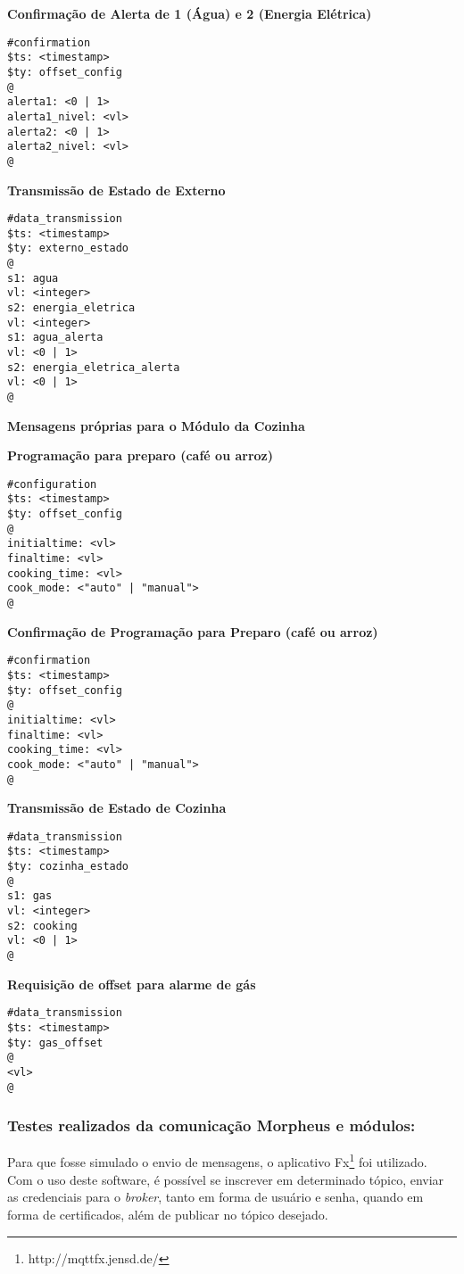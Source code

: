 \textbf{Confirmação de Alerta de 1 (Água) e 2 (Energia Elétrica)}
\begin{lstlisting}
#confirmation
$ts: <timestamp>
$ty: offset_config
@
alerta1: <0 | 1>
alerta1_nivel: <vl>
alerta2: <0 | 1>
alerta2_nivel: <vl>
@
\end{lstlisting}

\textbf{Transmissão de Estado de Externo}
\begin{lstlisting}
#data_transmission
$ts: <timestamp>
$ty: externo_estado
@
s1: agua
vl: <integer>
s2: energia_eletrica
vl: <integer>
s1: agua_alerta
vl: <0 | 1>
s2: energia_eletrica_alerta
vl: <0 | 1>
@
\end{lstlisting}

\textbf{Mensagens próprias para o Módulo da Cozinha}

\textbf{Programação para preparo (café ou arroz)}
\begin{lstlisting}
#configuration
$ts: <timestamp>
$ty: offset_config
@
initialtime: <vl>
finaltime: <vl>
cooking_time: <vl>
cook_mode: <"auto" | "manual">
@
\end{lstlisting}

\textbf{Confirmação de Programação para Preparo (café ou arroz)}
\begin{lstlisting}
#confirmation
$ts: <timestamp>
$ty: offset_config
@
initialtime: <vl>
finaltime: <vl>
cooking_time: <vl>
cook_mode: <"auto" | "manual">
@
\end{lstlisting}

\textbf{Transmissão de Estado de Cozinha}
\begin{lstlisting}
#data_transmission
$ts: <timestamp>
$ty: cozinha_estado
@
s1: gas
vl: <integer>
s2: cooking
vl: <0 | 1>
@
\end{lstlisting}

\textbf{Requisição de offset para alarme de gás}
\begin{lstlisting}
#data_transmission
$ts: <timestamp>
$ty: gas_offset
@
<vl>
@
\end{lstlisting}

\subsubsection{Testes realizados da comunicação Morpheus e módulos:}

Para que fosse simulado o envio de mensagens, o aplicativo \wmqtt{} Fx\footnote{http://mqttfx.jensd.de/} foi utilizado. Com o uso deste software, é possível se inscrever em determinado tópico, enviar as credenciais para o \emph{broker}, tanto em forma de usuário e senha, quando em forma de certificados, além de publicar no tópico desejado.

